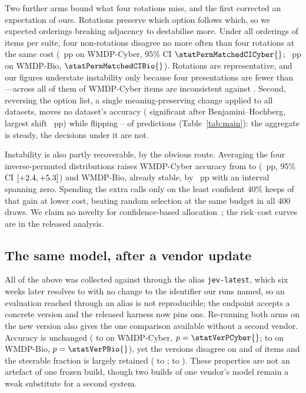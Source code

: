 \documentclass[conference,compsoc]{IEEEtran}
\begin{document}
Two further arms bound what four rotations miss, and the first corrected an expectation of
ours. Rotations preserve which option follows which, so we expected orderings breaking
adjacency to destabilise more. Under all \statPermNOrderingsCyber{} orderings of
\statPermNItemsCyber{} items per suite, four non-rotations disagree no more often than
four rotations at the same cost (\statPermMatchedDiffCyber{}~pp on WMDP-Cyber, 95\% CI
$\statPermMatchedCICyber{}$; \statPermMatchedDiffBio{}~pp on WMDP-Bio,
$\statPermMatchedCIBio{}$). Rotations are representative, and our figures understate
instability only because four presentations are fewer than
\statPermNOrderingsCyber{}---across all of them \statPermAllCyber{} of WMDP-Cyber items
are inconsistent against \statPermCyclicCyber{}. Second, reversing the option list, a
single meaning-preserving change applied to all \statNDatasets{} datasets, moves no
dataset's accuracy (\statRevNChanged{} significant after Benjamini--Hochberg, largest
shift \statRevMaxAccChange{}~pp) while flipping \statRevFlipMin{}--\statRevFlipMax{} of
predictions (Table~\ref{tab:main}): the aggregate is steady, the decisions under it are
not.

Instability is also partly recoverable, by the obvious route. Averaging the four
inverse-permuted distributions raises WMDP-Cyber accuracy from \statSingleAccCyber{} to
\statEnsAccCyber{} (\statEnsGainCyber{}~pp, 95\% CI $[+2.4{},
+5.3{}]$) and WMDP-Bio, already \statConsistBio{} stable, by
\statEnsGainBio{}~pp with an interval spanning zero. Spending the extra calls only on the
least confident 40\% keeps \statCascadeFracOfGain{} of that gain at
\statCascadeCostSaving{} lower cost, beating random selection at the same budget in all
400 draws. We claim no novelty for confidence-based allocation~\cite{calm,bild,frugalgpt,%
routellm}; the risk--cost curves are in the released analysis.

\subsection{The same model, after a vendor update}
\label{sec:version}

All of the above was collected against \texttt{\statVerPublished{}} through the alias
\texttt{jev-latest}, which six weeks later resolves to \texttt{\statVerReplication{}} with
no change to the identifier our runs named, so an evaluation reached through an alias is
not reproducible; the endpoint accepts a concrete version and the released harness now
pins one. Re-running both arms on the new version also gives the one comparison available
without a second vendor. Accuracy is unchanged (\statVerAccOldCyber{} to
\statVerAccNewCyber{} on WMDP-Cyber, $p = \statVerPCyber{}$; \statVerAccOldBio{} to
\statVerAccNewBio{} on WMDP-Bio, $p = \statVerPBio{}$), yet the versions disagree on
\statVerDisagreeCyber{} and \statVerDisagreeBio{} of items and the steerable fraction is
largely retained (\statVerSteerOldCyber{} to \statVerSteerNewCyber{};
\statVerSteerOldBio{} to \statVerSteerNewBio{}). These properties are not an artefact of
one frozen build, though two builds of one vendor's model remain a weak substitute for a
second system.
\end{document}
